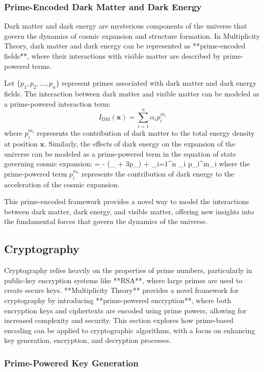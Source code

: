 \documentclass[12pt]{article}
\begin{document}
\subsubsection{Prime-Encoded Dark Matter and Dark Energy}

Dark matter and dark energy are mysterious components of the universe that govern the dynamics of cosmic expansion and structure formation. In Multiplicity Theory, dark matter and dark energy can be represented as **prime-encoded fields**, where their interactions with visible matter are described by prime-powered terms.

Let \( \{p_1, p_2, \dots, p_n\} \) represent primes associated with dark matter and dark energy fields. The interaction between dark matter and visible matter can be modeled as a prime-powered interaction term:
\[
I_{\text{DM}}(\mathbf{x}) = \sum_{i=1}^{n} \alpha_i p_i^{m_i}
\]
where \( p_i^{m_i} \) represents the contribution of dark matter to the total energy density at position \( \mathbf{x} \). Similarly, the effects of dark energy on the expansion of the universe can be modeled as a prime-powered term in the equation of state governing cosmic expansion:
\]
 = - (\rho_{} + 3p_{}) + \sum_{i=1}^{n} \beta_i p_i^{m_i}
\]
where the prime-powered term \( p_i^{m_i} \) represents the contribution of dark energy to the acceleration of the cosmic expansion.

This prime-encoded framework provides a novel way to model the interactions between dark matter, dark energy, and visible matter, offering new insights into the fundamental forces that govern the dynamics of the universe.


\subsection{Cryptography}

Cryptography relies heavily on the properties of prime numbers, particularly in public-key encryption systems like **RSA**, where large primes are used to create secure keys. **Multiplicity Theory** provides a novel framework for cryptography by introducing **prime-powered encryption**, where both encryption keys and ciphertexts are encoded using prime powers, allowing for increased complexity and security. This section explores how prime-based encoding can be applied to cryptographic algorithms, with a focus on enhancing key generation, encryption, and decryption processes.

\subsubsection{Prime-Powered Key Generation}
\end{document}
